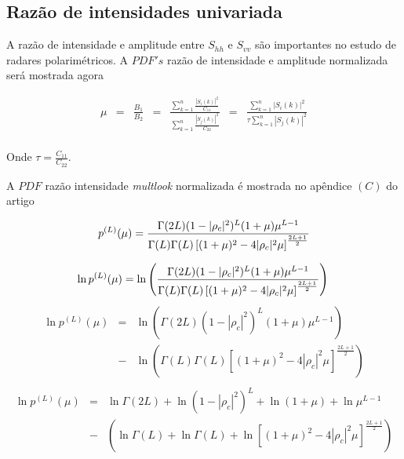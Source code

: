 \documentclass[remotesensing,article,submit,moreauthors,pdftex]{Definitions/mdpi}
\begin{document}
\subsection{Razão de intensidades univariada}
A razão de intensidade e amplitude entre $S_{hh}$ e $S_{vv}$ são importantes no estudo de radares polarimétricos. A $PDF's$ razão de intensidade e amplitude normalizada será mostrada agora

\begin{equation}\label{eqn63}
\begin{array}{ccccccc}
	\mu&=&\frac{B_1}{B_2}&=&\frac{\sum_{k=1}^{n}\frac{|S_i(k)|^2}{C_{11}}}{\sum_{k=1}^{n}\frac{|S_j(k)|^2}{C_{22}}}&=&\frac{\sum_{k=1}^{n}|S_i(k)|^2}{\tau\sum_{k=1}^{n}|S_j(k)|^2}\\
\end{array}
\end{equation}

Onde $\tau=\frac{C_{11}}{C_{22}}$.

A $PDF$ razão intensidade {\it multlook} normalizada é mostrada no apêndice $(C)$ do artigo \cite{lee}  


\begin{equation}\label{eqn64}
	p^{(L)}(\mu)=\frac{\Gamma(2L)(1-|\rho_c|^2)^{L}(1+\mu)\mu^{L-1}}{\Gamma(L)\Gamma(L)\left[(1+\mu)^2-4|\rho_c|^2\mu \right]^{\frac{2L+1}{2}}}\\
\end{equation}

\begin{equation}\label{eqn64}
	\ln p^{(L)}(\mu)=\ln\left(\frac{\Gamma(2L)(1-|\rho_c|^2)^{L}(1+\mu)\mu^{L-1}}{\Gamma(L)\Gamma(L)\left[(1+\mu)^2-4|\rho_c|^2\mu \right]^{\frac{2L+1}{2}}}\right)\\
\end{equation}
\begin{equation}\label{eqn64}
\begin{array}{ccc}
	\ln p^{(L)}(\mu)&=&\ln\left(\Gamma(2L)(1-|\rho_c|^2)^{L}(1+\mu)\mu^{L-1}\right)\\
	&-&\ln\left(\Gamma(L)\Gamma(L)\left[(1+\mu)^2-4|\rho_c|^2\mu \right]^{\frac{2L+1}{2}}\right)\\
\end{array}
\end{equation}
\begin{equation}\label{eqn64}
\begin{array}{ccc}
	\ln p^{(L)}(\mu)&=&\ln\Gamma(2L) +\ln(1-|\rho_c|^2)^{L}+\ln(1+\mu)+\ln\mu^{L-1}\\
	&-&\left(\ln\Gamma(L)+\ln\Gamma(L)+\ln\left[(1+\mu)^2-4|\rho_c|^2\mu \right]^{\frac{2L+1}{2}}\right)\\
\end{array}
\end{equation}
\end{document}
